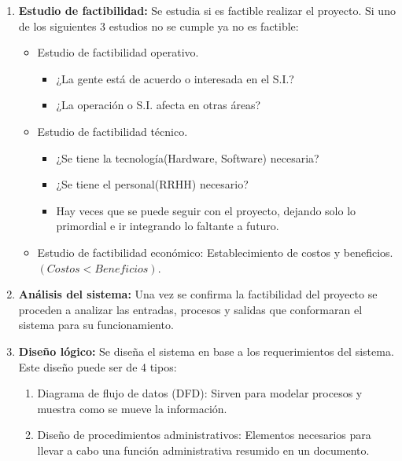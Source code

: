 \documentclass{templateNote}
\begin{document}
\begin{enumerate}
\begin{itemize}
\begin{itemize}
            \item Requerimientos funcionales (Estadísticas, gráficas y cosas que el sistema puede crear con los datos que maneja).
            
            \item Requerimientos de seguridad (Claves y niveles de acceso).
        \end{itemize}
    \end{itemize}

    \item \textbf{Estudio de factibilidad:} Se estudia si es factible realizar el proyecto. Si uno de los siguientes 3 estudios no se cumple ya no es factible:
    \begin{itemize}
        \item Estudio de factibilidad operativo.
        \begin{itemize}
            \item ¿La gente est\'a de acuerdo o interesada en el S.I.?
            \item ¿La operaci\'on o S.I. afecta en otras \'areas?
        \end{itemize}

        \item Estudio de factibilidad técnico.
        \begin{itemize}
            \item ¿Se tiene la tecnolog\'ia(Hardware, Software) necesaria?
            \item ¿Se tiene el personal(RRHH) necesario?
            \item Hay veces que se puede seguir con el proyecto, dejando solo lo primordial e ir integrando lo faltante a futuro.
        \end{itemize}
        \item Estudio de factibilidad económico: Establecimiento de costos y beneficios. $(Costos < Beneficios)$.
    \end{itemize}
    \item \textbf{Análisis del sistema:} Una vez se confirma la factibilidad del proyecto se proceden a analizar las entradas, procesos y salidas que conformaran el sistema para su funcionamiento.
    \item \textbf{Diseño lógico:} Se diseña el sistema en base a los requerimientos del sistema. Este diseño puede ser de 4 tipos:
        \begin{enumerate}
            \item Diagrama de flujo de datos (DFD): Sirven para modelar procesos y muestra como se mueve la información.
            \item Diseño de procedimientos administrativos: Elementos necesarios para llevar a cabo una función administrativa resumido en un documento.
            

\end{enumerate}
\end{enumerate}
\end{document}
